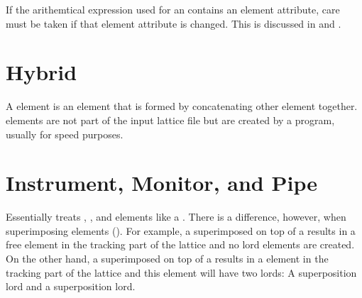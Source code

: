 If the arithemtical expression used for an  contains an element attribute,
care must be taken if that element attribute is changed. This is discussed in
 and .

\section{Hybrid}
\label{s:hybrid}

A  element is an element that is formed by concatenating
other element together.  elements are not part of the input
lattice file but are created by a program, usually for speed purposes.

\section{Instrument, Monitor, and Pipe}
\label{s:monitor}

Essentially \bmad treats , , and 
elements like a . There is a difference, however, when
superimposing elements (). For example, a
 superimposed on top of a  results in a free
 element in the tracking part of the lattice and no
lord elements are created. On the other hand, a 
superimposed on top of a  results in a 
element in the tracking part of the lattice and this 
element will have two lords: A  superposition lord and
a  superposition lord.

